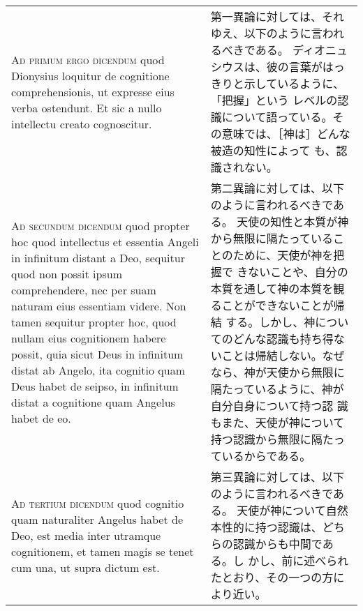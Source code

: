 \documentclass[10pt]{jsarticle} %
\begin{document}
\begin{longtable}{p{21em}p{21em}}
{\scshape Ad primum ergo dicendum} quod Dionysius
loquitur de cognitione comprehensionis, ut expresse eius verba
ostendunt. Et sic a nullo intellectu creato cognoscitur.


&

第一異論に対しては、それゆえ、以下のように言われるべきである。
ディオニュシウスは、彼の言葉がはっきりと示しているように、「把握」という
 レベルの認識について語っている。その意味では、［神は］どんな被造の知性によって
 も、認識されない。

\\


{\scshape Ad secundum dicendum} quod propter hoc quod
intellectus et essentia Angeli in infinitum distant a Deo, sequitur quod
non possit ipsum comprehendere, nec per suam naturam eius essentiam
videre. Non tamen sequitur propter hoc, quod nullam eius cognitionem
habere possit, quia sicut Deus in infinitum distat ab Angelo, ita
cognitio quam Deus habet de seipso, in infinitum distat a cognitione
quam Angelus habet de eo.


&

第二異論に対しては、以下のように言われるべきである。
天使の知性と本質が神から無限に隔たっていることのために、天使が神を把握で
 きないことや、自分の本質を通して神の本質を観ることができないことが帰結
 する。しかし、神についてのどんな認識も持ち得ないことは帰結しない。なぜ
 なら、神が天使から無限に隔たっているように、神が自分自身について持つ認
 識もまた、天使が神について持つ認識から無限に隔たっているからである。


\\


{\scshape Ad tertium dicendum} quod cognitio quam
naturaliter Angelus habet de Deo, est media inter utramque cognitionem,
et tamen magis se tenet cum una, ut supra dictum est.



&

第三異論に対しては、以下のように言われるべきである。
天使が神について自然本性的に持つ認識は、どちらの認識からも中間である。し
 かし、前に述べられたとおり、その一つの方により近い。


\end{longtable}
\end{document}
